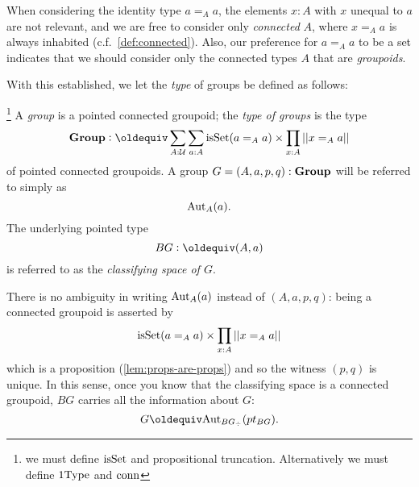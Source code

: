\begin{definition}
\begin{remark}
  When considering the identity type $a=_Aa$, the elements $x:A$ with $x$ unequal to $a$ are not relevant, and we are free to consider only \emph{connected} $A$, \ie where $x=_Aa$ is always inhabited (c.f.~\cref{def:connected}).  Also, our preference for $a=_Aa$ to be a set indicates that we should consider only the connected types $A$ that are \emph{groupoids}.
\end{remark}


With this established, we let the \emph{type} of groups be defined as follows:

\begin{definition}\label{def:typegroup}\footnote{we must define  $\mathrm{isSet}$ and propositional truncation.  Alternatively we must define $\mathrm{1Type}$ and $\mathrm{conn}$}
  A \emph{group} is a pointed connected groupoid; the \emph{type of groups} is the type 
$$\typegroup\defequi\sum_{A:\mathcal U}\sum_{a:A}\isset(a=_Aa)\times\prod_{x:A}||x=_Aa||$$
of pointed connected groupoids.
A group $G=(A,a,p,q):\mathbf{Group}$ will be referred to simply as $$\mathrm{Aut}_A(a).$$  The underlying pointed type $$BG\defequi(A,a)$$ is referred to as the \emph{classifying space of $G$}. 
\end{definition}
\begin{remark}\label{rem:aut}
There is no ambiguity in writing $\mathrm{Aut}_A(a)$ instead of $(A,a,p,q)$: being a connected groupoid is asserted by 
$$\mathrm{isSet}(a=_Aa)\times\prod_{x:A}||x=_Aa||$$ which is a proposition  (\cref{lem:props-are-props}) and so the witness $(p,q)$  is unique.  In this sense, once you know that the classifying space is a connected groupoid, $BG$ carries all the information about $G$: $$G\oldequiv\aut_{BG_\div}(pt_{BG}).$$
\end{remark}
\end{definition}
